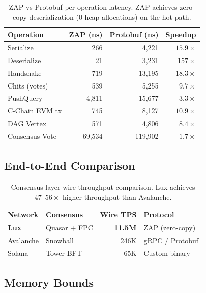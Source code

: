 \documentclass[11pt,a4paper]{article}
\begin{document}
\begin{table}[ht]
\centering
\small
\begin{tabular}{@{}lrrr@{}}
\toprule
\textbf{Operation} & \textbf{ZAP (ns)} & \textbf{Protobuf (ns)} & \textbf{Speedup} \\
\midrule
Serialize         & 266    & 4{,}221   & $15.9\times$ \\
Deserialize       & 21     & 3{,}231   & $157\times$ \\
Handshake         & 719    & 13{,}195  & $18.3\times$ \\
Chits (votes)     & 539    & 5{,}255   & $9.7\times$ \\
PushQuery         & 4{,}811 & 15{,}677 & $3.3\times$ \\
C-Chain EVM tx    & 745    & 8{,}127   & $10.9\times$ \\
DAG Vertex        & 571    & 4{,}806   & $8.4\times$ \\
Consensus Vote    & 69{,}534 & 119{,}902 & $1.7\times$ \\
\bottomrule
\end{tabular}
\caption{ZAP vs Protobuf per-operation latency. ZAP achieves zero-copy
deserialization (0 heap allocations) on the hot path.}
\label{tab:zapvsproto}
\end{table}

\subsection{End-to-End Comparison}

\begin{table}[ht]
\centering
\begin{tabular}{@{}llrl@{}}
\toprule
\textbf{Network} & \textbf{Consensus} & \textbf{Wire TPS} & \textbf{Protocol} \\
\midrule
\textbf{Lux}  & Quasar + FPC & \textbf{11.5M} & ZAP (zero-copy) \\
Avalanche      & Snowball     & 246K           & gRPC / Protobuf \\
Solana         & Tower BFT    & 65K            & Custom binary \\
\bottomrule
\end{tabular}
\caption{Consensus-layer wire throughput comparison.
Lux achieves $47\text{--}56\times$ higher throughput than Avalanche.}
\label{tab:comparison}
\end{table}

\subsection{Memory Bounds}
\end{document}
